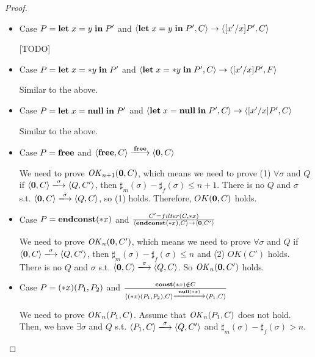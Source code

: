 \begin{proof}
\begin{itemize}
\item Case \(P = \mathbf{let}\; x = y \; \mathbf{in}\; P'\) and \( \langle \mathbf{let}\; x = y \;
  \mathbf{in}\; P', C \rangle \rightarrow \langle [x'/x]P', C \rangle\)

  [TODO]
  
\item Case \(P = \mathbf{let}\; x = *y \; \mathbf{in}\; P'\) and \( \langle \mathbf{let}\; x = *y \;
  \mathbf{in}\; P', C \rangle \rightarrow \langle [x'/x]P', F \rangle\)

    Similar to the above.
  
\item Case \(P = \mathbf{let}\; x = \mathbf{null} \; \mathbf{in}\; P'\) and \( \langle \mathbf{let}\; x = \mathbf{null} \;
  \mathbf{in}\; P', C \rangle \rightarrow \langle [x'/x]P', C \rangle\)
  
    Similar to the above.
  
\item Case \(P = \mathbf{free}\) and \(\langle \Free, C \rangle
  \xlongrightarrow{\Free} \langle {\bf 0}, C \rangle \)

  We need to prove \(\mathit{OK}_{n+1}({\bf 0}, C)\), which means we need to
  prove (1) \( \forall \sigma \) and \(Q\) if \( \langle {\bf 0}, C
  \rangle \xlongrightarrow{\sigma} \langle Q, C' \rangle \), then
  \(\sharp_{m}(\sigma) - \sharp_{f}(\sigma) \le n + 1\).  There is no
  \(Q\) and \(\sigma\) s.t. \(\langle {\bf 0}, C \rangle
  \xlongrightarrow{\sigma} \langle Q, C \rangle \), so (1)
  holds. Therefore, \(OK({\bf 0}, C)\) holds.

\item Case \(P = \mathbf{endconst}(*x)\) and \(\frac {C' = filter(C, *x) }
  {\langle \mathbf{endconst}(*x), C \rangle \rightarrow \langle {\bf 0}, C' \rangle} \)

  We need to prove \(\mathit{OK}_n({\bf 0}, C')\), which means we need to
  prove \( \forall \sigma \) and \(Q\) if \( \langle {\bf 0}, C
  \rangle \xlongrightarrow{\sigma} \langle Q, C' \rangle \), then
  \(\sharp_{m}(\sigma) - \sharp_{f}(\sigma) \le n\) and (2) \(
  OK(C')\) holds.  There is no \(Q\) and \(\sigma\) s.t. \(\langle
  {\bf 0}, C \rangle \xlongrightarrow{\sigma} \langle Q, C \rangle
  \). So \(\mathit{OK}_n({\bf 0}, C')\) holds.
  
    
\item Case \( P = (*x)(P_1,P_2) \) and \( \frac{ \scon\Sirx \notin C}
  { \langle \Sirx(P_1, P_2), C \rangle \xlongrightarrow{\snull} \langle P_1, C
    \rangle } \)

  We need to prove \(\mathit{OK}_n(P_1, C)\).  Assume that \(\mathit{OK}_n(P_1, C)\)
  does not hold. Then, we have \( \exists \sigma \) and \(Q\)
  s.t. \( \langle P_1, C \rangle \xlongrightarrow{\sigma} \langle Q,
  C' \rangle \) and \(\sharp_{m}(\sigma) -
  \sharp_{f}(\sigma) > n\).


\end{itemize}
\end{proof}
